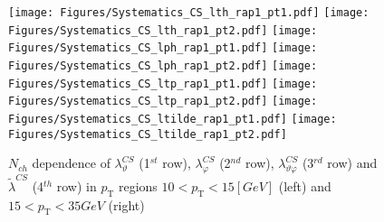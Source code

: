 \documentclass[12pt]{article}
\newcommand{\pT}{p_\mathrm{T}}
\newcommand{\lamthCS}{\lambda^{\scriptscriptstyle CS}_\vartheta}
\newcommand{\lamphCS}{\lambda^{\scriptscriptstyle CS}_\varphi}
\newcommand{\lamthphCS}{\lambda^{\scriptscriptstyle CS}_{\vartheta \varphi}}
\newcommand{\lamtildeCS}{\tilde{\lambda}^{\scriptscriptstyle CS}}
\begin{document}
\begin{figure}[htbp]
\centering
\texttt{[image: Figures/Systematics\_CS\_lth\_rap1\_pt1.pdf]}
\texttt{[image: Figures/Systematics\_CS\_lth\_rap1\_pt2.pdf]}
\texttt{[image: Figures/Systematics\_CS\_lph\_rap1\_pt1.pdf]}
\texttt{[image: Figures/Systematics\_CS\_lph\_rap1\_pt2.pdf]}
\texttt{[image: Figures/Systematics\_CS\_ltp\_rap1\_pt1.pdf]}
\texttt{[image: Figures/Systematics\_CS\_ltp\_rap1\_pt2.pdf]}
\texttt{[image: Figures/Systematics\_CS\_ltilde\_rap1\_pt1.pdf]}
\texttt{[image: Figures/Systematics\_CS\_ltilde\_rap1\_pt2.pdf]}
\caption{$N_{ch}$ dependence of $\lamthCS$
(1$^{st}$ row), $\lamphCS$ (2$^{nd}$ row), $\lamthphCS$ (3$^{rd}$ row) and 
$\lamtildeCS$ (4$^{th}$ row) in $\pT$ regions $10 < \pT < 15 [GeV]$ (left) and
$15 < \pT < 35 GeV$ (right)}
\end{figure}
\clearpage
\end{document}
